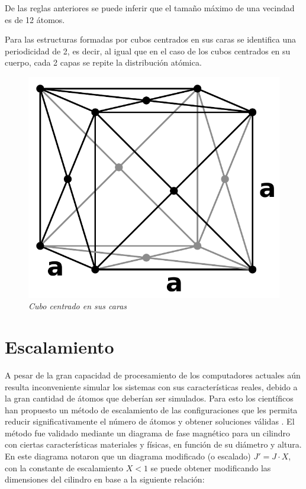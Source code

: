 De las reglas anteriores se puede inferir que el tamaño máximo de una vecindad es de 12 átomos.

Para las estructuras formadas por cubos centrados en sus caras se identifica una periodicidad de 2, es decir, al igual que en el caso de los cubos centrados en su cuerpo, cada 2 capas se repite la distribución atómica.

\begin{figure}[ht]
  \centering
  \includegraphics[scale=.6]{images/FaceCenteredCubic}
  \caption{\em Cubo centrado en sus caras}
  \label{FaceCenteredCubic}
\end{figure}

\section{Escalamiento}

A pesar de la gran capacidad de procesamiento de los computadores actuales aún resulta inconveniente simular los sistemas con sus características reales, debido a la gran cantidad de átomos que deberían ser simulados. Para esto los científicos han propuesto un método de escalamiento de las configuraciones que les permita reducir significativamente el número de átomos y obtener soluciones válidas \citep{PhysRevB.71.094435}. El método fue validado mediante un diagrama de fase magnético para un cilindro con ciertas características materiales y físicas, en función de su diámetro y altura. En este diagrama notaron que un diagrama modificado (o escalado) $J' = J \cdot X$, con la constante de escalamiento $X < 1$ se puede obtener modificando las dimensiones del cilindro en base a la siguiente relación:

